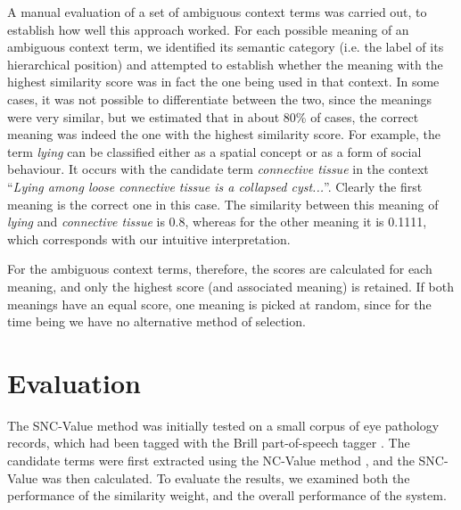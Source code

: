 A manual evaluation of a set of ambiguous context terms was carried out, to
establish how well this approach worked. For each possible
meaning of an ambiguous context term, we identified its semantic category (i.e.
the label of its hierarchical position) and attempted to establish
whether the meaning with the highest similarity score was in fact the
one being used in that context. In some cases, it was not possible to
differentiate between the two, since the meanings were very similar,
but we estimated that in about 80\% of cases, the correct
meaning was indeed the one with the highest similarity score. For
example, the term {\it lying} can be classified either as a spatial
concept or as a form of social behaviour. It occurs with the candidate
term {\it connective tissue} in the context ``{\it Lying among loose connective
tissue is a collapsed cyst...}''. Clearly the first meaning is the
correct one in this case. The similarity between this meaning of
{\it lying} and {\it connective tissue} is 0.8, whereas for the
other meaning it is 0.1111, which corresponds with our intuitive
interpretation.

For the ambiguous context terms, therefore, the scores are calculated
for each meaning, and only the highest score (and associated meaning)
is retained. If both meanings have an equal score, one meaning is
picked at random, since for the time being we have no alternative
method of selection.

\section{Evaluation}
The SNC-Value method was initially tested on a small corpus of eye pathology
records, which had been tagged with the Brill part-of-speech tagger
\cite{Brill92}. The candidate terms were first extracted using the
NC-Value method \cite{Frantzi98}, and the SNC-Value was then calculated.
To evaluate the results, we examined both the performance of the
similarity weight, and the overall performance of the system.


